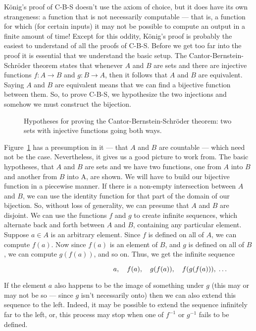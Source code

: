 K\"{o}nig's proof of C-B-S doesn't use the axiom of choice, but it does have
its own strangeness: a function that is not necessarily computable --- that is,
a function for which (for certain inputs) it may not be possible to compute
an output in a finite amount of time!  Except for this oddity, 
K\"{o}nig's proof
is probably the easiest to understand of all the proofs of C-B-S. 
Before we get too far into the proof it is essential that we understand the
basic setup.  The Cantor-Bernstein-Schr\"{o}der theorem states that 
whenever $A$
and $B$ are sets and there are injective functions 
$f : A \longrightarrow B$ and $g : B \longrightarrow A$,
then it follows that $A$ and $B$ are equivalent.  Saying $A$ and $B$ 
are equivalent
means that we can find a bijective function between them.  So, to prove 
C-B-S, we hypothesize the two injections and somehow we must construct the
bijection.

\begin{figure}[!hbtp]
\begin{center}

\end{center}
\caption[Setup for proving the C-B-S theorem.]{Hypotheses for %
proving the Cantor-Bernstein-Schr\"{o}der theorem: %
two sets with injective functions going both ways.}
\label{fig:CBS_setup} 
\end{figure}

Figure~\ref{fig:CBS_setup} has a presumption in it --- 
that $A$ and $B$ are countable --- which
need not be the case.  Nevertheless, it gives us a good picture to work from.
The basic hypotheses, that $A$ and $B$ are sets and we have two functions, one
from $A$ into $B$ and another from $B$ into A, are shown.  
We will have to build our bijective function in a piecewise manner.
If there is a non-empty intersection between $A$ and $B$, we can use the
identity function for that part of the domain of our bijection.  
So, without
loss of generality, we can presume that $A$ and $B$ are disjoint.  
We can use
the functions $f$ and $g$ to create infinite sequences, which 
alternate back and
forth between $A$ and $B$, containing any particular element.
Suppose  $a \in A$ is an arbitrary element.  Since $f$ is defined 
on all of $A$, we
can compute $f(a)$.  Now since $f(a)$ is an element of $B$, and $g$ is 
defined on all
of $B$, we can compute $g(f(a))$, and so on.  Thus, we get the 
infinite sequence

\[ \rule{120pt}{0pt} a, \quad  f(a), \quad g(f(a)), \quad f(g(f(a))), \; \ldots \]

If the element $a$ also happens to be the image of something under $g$ (this
may or may not be so --- since $g$ isn't necessarily onto) then we 
can also extend
this sequence to the left.  Indeed, it may be possible to 
extend the sequence infinitely far to the left, or, this 
process may stop when one of $f^{-1}$ or $g^{-1}$
fails to be defined. 


